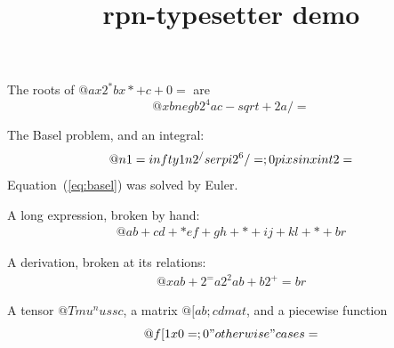 \documentclass{article}
\title{rpn-typesetter demo}
\date{}
\begin{document}
\maketitle

The roots of $@ a x 2 ^ * b x * + c + 0 =$ are
\[@ x b neg b 2 ^ 4ac - sqrt + 2a / = \]

The Basel problem, and an integral:
\begin{align}@
  \label{eq:basel} n 1 = infty 1 n 2 ^ / ser pi 2 ^ 6 / = ;
  0 pi x sin x int 2 = \notag
\end{align}
Equation~(\ref{eq:basel}) was solved by Euler.

A long expression, broken by hand:
\begin{multline}@
  a b + c d + * e f + g h + * + i j + k l + * + br
\end{multline}

A derivation, broken at its relations:
\begin{align}@
  x a b + 2 ^ = a 2 ^ 2ab + b 2 ^ + = br
\end{align}

A tensor $@ T mu ^ nu ssc$, a matrix $@ [ a b ; c d mat$,
and a piecewise function
\[@ f [ 1 x 0 = ; 0 "otherwise" cases = \]
\end{document}
